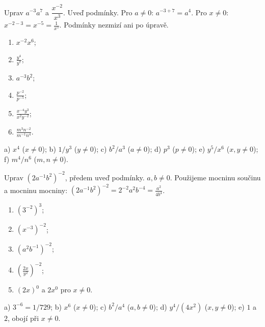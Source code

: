 \documentclass[11pt,a4paper]{article}
\begin{document}
\begin{prikladReseniBox}[title={Příklad 2}]
Uprav $a^{-3}a^7$ a $\dfrac{x^{-2}}{x^3}$. Uveď podmínky.
\tcblower
Pro $a\ne0$: $a^{-3+7}=a^4$. Pro $x\ne0$:
$x^{-2-3}=x^{-5}=\frac1{x^5}$. Podmínky nezmizí ani po úpravě.
\end{prikladReseniBox}
\begin{zadaniReseniBox}[title={Samostatná práce 2}]
\begin{enumerate}[label=\alph*)]
\item $x^{-2}x^6$; \item $\frac{y^4}{y^7}$;
\item $a^{-3}b^2$; \item $\frac{p^{-2}}{p^{-5}}$;
\item $\frac{x^{-4}y^3}{x^2y^{-2}}$;
\item $\frac{m^3n^{-2}}{m^{-1}n^4}$.
\end{enumerate}
\tcblower
 a) $x^4$ ($x\ne0$); b) $1/y^3$ ($y\ne0$);
 c) $b^2/a^3$ ($a\ne0$); d) $p^3$ ($p\ne0$);
 e) $y^5/x^6$ ($x,y\ne0$); f) $m^4/n^6$ ($m,n\ne0$).
\end{zadaniReseniBox}
\begin{prikladReseniBox}[title={Příklad 3}]
Uprav $(2a^{-1}b^2)^{-2}$, předem uveď podmínky.
\tcblower
$a,b\ne0$. Použijeme mocninu součinu a mocninu mocniny:
$(2a^{-1}b^2)^{-2}=2^{-2}a^2b^{-4}=\boxed{\frac{a^2}{4b^4}}$.
\end{prikladReseniBox}
\begin{zadaniReseniBox}[title={Samostatná práce 3},breakable=false]
\begin{enumerate}[label=\alph*)]
\item $(3^{-2})^3$; \item $(x^{-3})^{-2}$;
\item $(a^2b^{-1})^{-2}$; \item $\left(\frac{2x}{y^2}\right)^{-2}$;
\item $(2x)^0$ a $2x^0$ pro $x\ne0$.
\end{enumerate}
\tcblower
 a) $3^{-6}=1/729$; b) $x^6$ ($x\ne0$);
 c) $b^2/a^4$ ($a,b\ne0$);
 d) $y^4/(4x^2)$ ($x,y\ne0$);
 e) $1$ a $2$, obojí při $x\ne0$.
\end{zadaniReseniBox}
\end{document}
